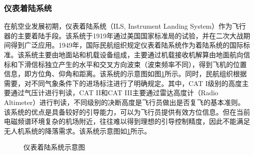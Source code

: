 \subsubsection{仪表着陆系统}
在航空业发展初期，仪表着陆系统（ILS, Instrument Landing System）作为飞行器的主要着陆手段。该系统于1919年通过美国国家标准局的试验，并在二次大战期间得到广泛应用。1949年，国际民航组织规定仪表着陆系统作为着陆系统的国际标准。该系统主要由地面站和机载设备组成，主要通过机载接收机解算由地面航向信标和下滑信标独立产生的水平和交叉方向波束（波束频率不同），得到飞机的位置信息，即方位角、仰角和距离。该系统的示意图如图\ref{fig:07_ILS}所示。同时，民航组织根据需要，对不同气象条件下的进场标注进行了明确规定。其中，CAT I级别的高度主要通过气压计进行判读，CAT II和CAT III主要通过雷达高度计（Radio Altimeter）进行判读，不同级别的决断高度是飞行员做出是否复飞的基本准则。该系统的优点是具备较好的引导能力，可以为飞行员提供有效方位信息。但在当前电磁频谱环境复杂的机场附近，往往难以得到理想的引导控制精度，因此不能满足无人机系统的降落需求。该系统示意图如\ref{fig:07_ILS}所示。

\begin{figure}[htb]
	\centering%
	\hspace{4em}%
	\caption{仪表着陆系统示意图}
	\label{fig:07_ILS}
\end{figure}

